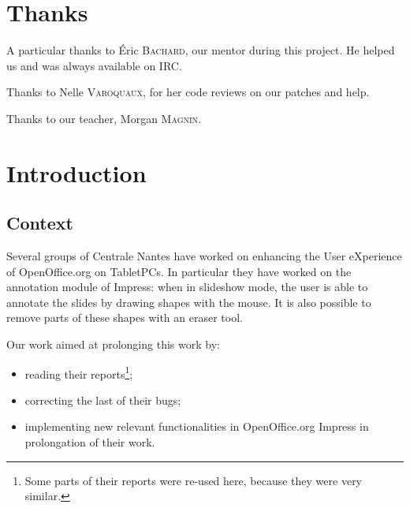 \documentclass[a4paper,11pt]{article}
\begin{document}
\newpage
\tableofcontents

\newpage

\setcounter{page}{1}
\fancyfoot[C]{\thepage}
\section*{Thanks}
A particular thanks to Éric \textsc{Bachard}, our mentor during this project. He helped us and was always available on IRC.

Thanks to Nelle \textsc{Varoquaux}, for her code reviews on our patches and help.

Thanks to our teacher, Morgan \textsc{Magnin}.

\newpage

\fancyfoot[C]{\thepage}
\section*{Introduction}

\subsection*{Context}

Several groups of Centrale Nantes have worked on enhancing the User eXperience
of OpenOffice.org on TabletPCs. In particular they have worked on the
annotation module of Impress: when in slideshow mode, the user is able to
annotate the slides by drawing shapes with the mouse. It is also possible to
remove parts of these shapes with an eraser tool.

Our work aimed at prolonging this work by:

\begin{itemize}

\item reading their reports\footnote{Some parts of their reports were re-used
here, because they were very similar.};

\item correcting the last of their bugs;

\item implementing new relevant functionalities in OpenOffice.org Impress in
prolongation of their work.

\end{itemize}
\end{document}

